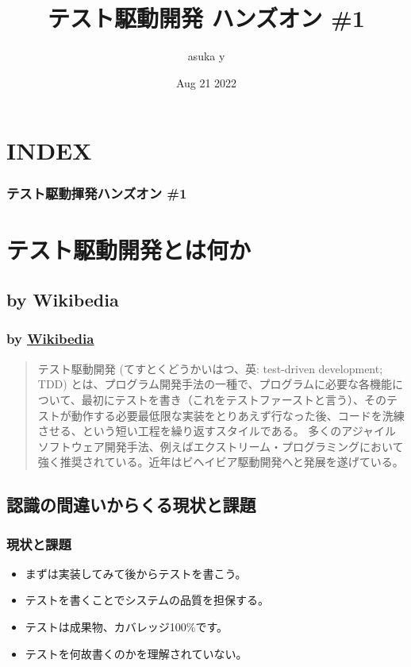 \documentclass[aspectratio=169]{beamer}
\title{テスト駆動開発 ハンズオン \#1}
\author{asuka y}
\date{Aug 21 2022}
\begin{document}
\begin{frame}
  \titlepage
\end{frame}

\section*{INDEX}
\begin{frame}
  \frametitle{テスト駆動揮発ハンズオン \#1}
  \tableofcontents
\end{frame}

\section{テスト駆動開発とは何か}
\subsection{by Wikibedia}
\begin{frame}\frametitle{
    by
    \href{https://ja.wikipedia.org/wiki/\%E3\%83\%86\%E3\%82\%B9\%E3\%83\%88\%E9\%A7\%86\%E5\%8B\%95\%E9\%96\%8B\%E7\%99\%BA}{\underline{Wikibedia}}
  }
  \begin{quotation}
    テスト駆動開発 (てすとくどうかいはつ、英: test-driven development; TDD) とは、プログラム開発手法の一種で、プログラムに必要な各機能について、最初にテストを書き（これをテストファーストと言う）、そのテストが動作する必要最低限な実装をとりあえず行なった後、コードを洗練させる、という短い工程を繰り返すスタイルである。  
    多くのアジャイルソフトウェア開発手法、例えばエクストリーム・プログラミングにおいて強く推奨されている。近年はビヘイビア駆動開発へと発展を遂げている。
  \end{quotation}
\end{frame}

\subsection{認識の間違いからくる現状と課題}
\begin{frame}\frametitle{現状と課題}
  \begin{itemize}
    \item まずは実装してみて後からテストを書こう。
    \item テストを書くことでシステムの品質を担保する。
    \item テストは成果物、カバレッジ100\%です。
    \item テストを何故書くのかを理解されていない。
  \end{itemize}
\end{frame}
\end{document}
